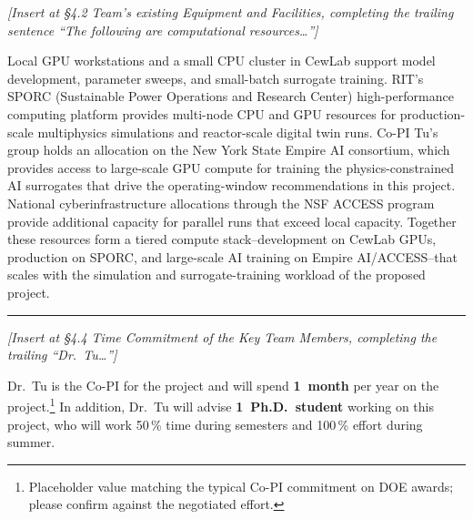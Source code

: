 \documentclass[11pt]{article}
\begin{document}
\noindent\textit{[Insert at \S4.2 Team's existing Equipment and Facilities, completing the trailing sentence ``The following are computational resources\ldots'']}\par

\noindent Local GPU workstations and a small CPU cluster in CewLab
support model development, parameter sweeps, and small-batch surrogate
training. RIT's SPORC (Sustainable Power Operations and Research
Center) high-performance computing platform provides multi-node CPU
and GPU resources for production-scale multiphysics simulations and
reactor-scale digital twin runs. Co-PI Tu's group holds an allocation
on the New York State Empire AI consortium, which provides access to
large-scale GPU compute for training the physics-constrained AI
surrogates that drive the operating-window recommendations in this
project. National cyberinfrastructure allocations through the NSF
ACCESS program provide additional capacity for parallel runs that
exceed local capacity. Together these resources form a tiered compute
stack--development on CewLab GPUs, production on SPORC, and large-scale
AI training on Empire AI/ACCESS--that scales with the simulation and
surrogate-training workload of the proposed project.

\vspace{1em}\noindent\rule{0.4\textwidth}{0.4pt}\vspace{0.6em}


\noindent\textit{[Insert at \S4.4 Time Commitment of the Key Team Members, completing the trailing ``Dr.\ Tu\ldots'']}\par

\noindent Dr.\ Tu is the Co-PI for the project and will spend
\textbf{1~month} per year on the project.\footnote{Placeholder value
matching the typical Co-PI commitment on DOE awards; please confirm
against the negotiated effort.} In addition, Dr.\ Tu will advise
\textbf{1~Ph.D.\ student} working on this project, who will work 50\,\%
time during semesters and 100\,\% effort during summer.
\end{document}
